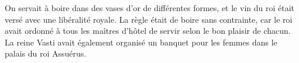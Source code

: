 On servait à boire dans des vases d’or de différentes formes,
	et le vin du roi était versé avec une libéralité royale.
La règle était de boire sans contrainte,
	car le roi avait ordonné à tous les maîtres d’hôtel
		de servir selon le bon plaisir de chacun.
La reine Vasti avait également organisé un banquet pour les femmes
		dans le palais du roi Assuérus.
